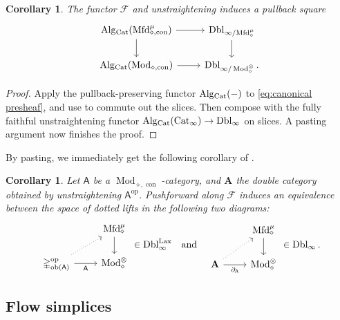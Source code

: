 \documentclass[10pt]{amsart}
\numberwithin{equation}{section}
\newtheorem{cor}[prop]{Corollary}
\theoremstyle{definition}
\DeclareMathOperator{\Mod}{Mod}
\DeclareMathOperator{\ob}{ob}
\DeclareMathOperator{\op}{op}
\DeclareMathOperator{\Lax}{Lax}
\DeclareMathOperator{\con}{con}
\newcommand{\Cat}{\mathrm{Cat}\vphantom{t}}
\newcommand{\Mfd}{\mathrm{Mfd}\vphantom{d}}
\newcommand{\Alg}{\mathrm{Alg}\vphantom{z}}
\newcommand{\Simp}{\mathbb{\Delta}}
\newcommand{\cF}{\mathcal{F}}
\newcommand{\bfA}{\mathbf{A}}
\newcommand{\sfA}{\mathsf{A}}
\newcommand{\Dbl}{\mathrm{Dbl}}
\newcommand{\DblLax}{ \mathrm{Dbl}_{\infty}^{\Lax}  }
\newcommand{\del}{\partial}
\renewcommand{\to}{\mathchoice{\longrightarrow}{\rightarrow}{}{}}
\begin{document}
\begin{cor}\label{cor:canonical_presheaf_pullback}
	The functor $\cF$ and unstraightening induces a pullback square
	\begin{equation*}
		\begin{tikzcd}
			\Alg_{\Cat}(\Mfd_{\diamond,\con}^{\mu} )\arrow[r] \arrow[d]      &   \Dbl_{\infty/\Mfd_{\diamond}^{\mu}}  \arrow[d] \\
			\Alg_{\Cat}(\Mod_{\diamond,\con} ) \arrow[r]                & \Dbl_{\infty/\Mod_{\diamond}^{\otimes}} \,.
		\end{tikzcd}
	\end{equation*}
\end{cor}
\begin{proof}
	Apply the pullback-preserving functor $\Alg_{\Cat}(-)$ to \eqref{eq:canonical presheaf}, and use  to commute out the slices. Then compose with the fully faithful unstraightening functor $\Alg_{\Cat}(\Cat_{\infty}) \to \Dbl_{\infty}$ on slices.
  A pasting argument now finishes the proof.
\end{proof}
By pasting, we immediately get the following corollary of .
\begin{cor} \label{cor:lax_lifts_double_functors}
	Let $\sfA$ be a $\Mod_{\diamond,\con}$-category, and $\bfA$ the double category obtained by unstraightening $\sfA^{\op}$.
  Pushforward along $\cF$ induces an equivalence between the space of dotted lifts in the following two diagrams:
	\begin{equation*}
		\begin{tikzcd}
			& \Mfd_{\diamond}^{\mu} \arrow[d] \\
			\Simp^{\op}_{\ob(\sfA)} \arrow[r, "\sf{A}"'] \arrow[ur, dotted] & \Mod_{\diamond}^{\otimes}
		\end{tikzcd}
		\in \DblLax
		\quad \text{and} \quad
		\begin{tikzcd}
			  & \Mfd_{\diamond}^{\mu} \arrow[d] \\
			\mathbf{A} \arrow[ur,dotted] \arrow[r, "\del_{\sfA}"']& \Mod_{\diamond}^{\otimes}
		\end{tikzcd}
		\in \Dbl_{\infty} \,.
	\end{equation*}
\end{cor}



\subsection{Flow simplices}\label{subsec:flow_simplices}
\end{document}
